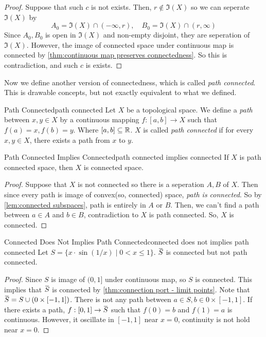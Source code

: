 \documentclass[12pt, a4paper, twoside]{article}
\newcommand{\overbar}[1]{\mkern 1.5mu\overline{\mkern-1.5mu#1\mkern-1.5mu}\mkern 1.5mu}
\theoremstyle{plain}
\begin{document}
\begin{proof}
    Suppose that such $c$ is not exists. 
    Then, $r \notin \Im(X)$ so we can seperate $\Im(X)$ by 
    \[A_0 = \Im(X) \cap (-\infty, r), \quad B_0 = \Im(X) \cap (r, \infty)\]
    Since $A_0, B_0$ is open in $\Im(X)$ and non-empty disjoint, 
    they are seperation of $\Im(X)$. However, the image of connected space under continuous map is connected by \ref{thm:continuous map preserves connectedness}.
    So this is contradiction, and such $c$ is exists. 
\end{proof}

Now we define another version of connectedness, which is called \textit{path connected}. 
This is drawable concepts, but not exactly equivalent to what we defined. 

\begin{defn}{Path Connected}{path connected}
    Let $X$ be a topological space. We define a \textit{path} between $x, y \in X$ by a continuous mapping 
    $f: [a, b] \rightarrow X$ such that $f(a) = x, f(b) = y$. Where $[a, b] \subseteq {\mathbb {R}}$. 
    $X$ is called \textit{path connected} if for every $x, y \in X$, there exists a path from $x$ to $y$. 
\end{defn}

\begin{thm}{Path Connected Implies Connected}{path connected implies connected}
    If $X$ is path connected space, then $X$ is connected space. 
\end{thm}

\begin{proof}
    Suppose that $X$ is not connected so there is a seperation $A, B$ of $X$. 
    Then since every path is image of convex(so, connected) space, \textit{path is connected}. 
    So by \ref{lem:connected subspaces}, path is entirely in $A$ or $B$. 
    Then, we can't find a path between $a \in A$ and $b \in B$, contradiction to $X$ is path connected. 
    So, $X$ is connected.
\end{proof}

\begin{prop}{Connected Does Not Implies Path Connected}{connected does not implies path connected}
    Let $S = \{x \cdot \sin(1/x) \mid 0 < x \leq 1\}$. $\overbar{S}$ is connected but not path connected. 
\end{prop}

\begin{proof}
    Since $S$ is image of $(0, 1]$ under continuous map, so $S$ is connected. This implies that $\overbar{S}$ is connected by \ref{thm:connection port - limit points}. 
    Note that $\overbar{S} = S \cup (0 \times [-1, 1])$. 
    There is not any path between $a \in S, b \in 0 \times [-1, 1]$. 
    If there exists a path, $f: [0, 1] \rightarrow \overbar{S}$ such that $f(0) = b$ and $f(1) = a$ is continuous. 
    However, it oscillate in $[-1, 1]$ near $x = 0$, continuity is not hold near $x = 0$. 
\end{proof}
\end{document}
